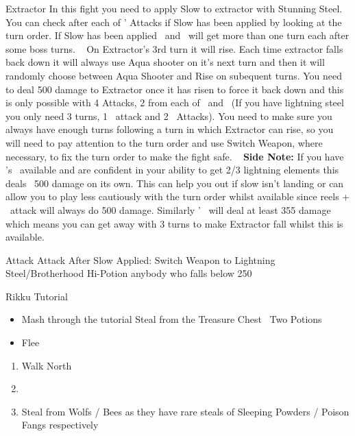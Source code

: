 \begin{battle}[4000]{Extractor}
In this fight you need to apply Slow to extractor with Stunning Steel. You can check after each of \tidus' Attacks if Slow has been applied by looking at the turn order. If Slow has been applied \tidus\ and \wakka\ will get more than one turn each after some boss turns.
\newline \ \newline
On Extractor's 3rd turn it will rise. Each time extractor falls back down it will always use Aqua shooter on it's next turn and then it will randomly choose between Aqua Shooter and Rise on subequent turns. You need to deal 500 damage to Extractor once it has risen to force it back down and this is only possible with 4 Attacks, 2 from each of \wakka\ and \tidus\ (If you have lightning steel you only need 3 turns, 1 \wakka\ attack and 2 \tidus\ Attacks). You need to make sure you always have enough turns following a turn in which Extractor can rise, so you will need to pay attention to the turn order and use Switch Weapon, where necessary, to fix the turn order to make the fight safe.
\newline \ \newline
\textbf{Side Note:} If you have \wakka's \od\ available and are confident in your ability to get 2/3 lightning elements this deals ~500 damage on its own. This can help you out if slow isn't landing or can allow you to play less cautiously with the turn order whilst available since reels + \tidus\ attack will always do 500 damage. Similarly \tidus' \od\ will deal at least 355 damage which means you can get away with 3 turns to make Extractor fall whilst this is available.
\newline \ \newline
	\begin{itemize}
		\tidusf Attack
		\wakkaf Attack
		\tidusf After Slow Applied: Switch Weapon to Lightning Steel/Brotherhood
		\wakkaf Hi-Potion anybody who falls below 250
	\end{itemize}
\end{battle}
\colstart
{}
\begin{battle}{Rikku Tutorial}
	\begin{itemize}
		\item Mash through the tutorial
		\rikkuf Steal from the Treasure Chest
		\rikkuf \od\ Two Potions
		\item Flee
	\end{itemize}
\end{battle}
\begin{enumerate}[resume]
	\item Walk North
	\item \formation{\tidus}{\rikku}{\auron}
	\item Steal from Wolfs / Bees as they have rare steals of Sleeping Powders / Poison Fangs respectively
\end{enumerate}